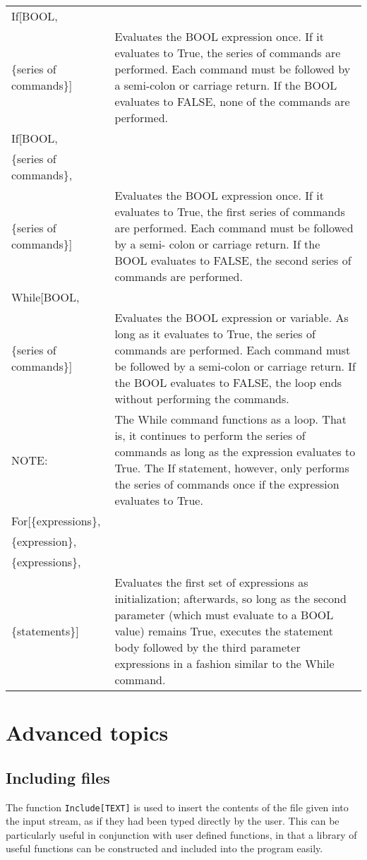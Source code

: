 \begin{tabular}{lp{4in}}
If[BOOL, & \\
\{series of commands\}] & Evaluates the BOOL expression
once. If it evaluates to True, the series of commands are performed.
Each command must be followed by a semi-colon or carriage return.  If
the BOOL evaluates to FALSE, none of the commands are performed.\\
If[BOOL, & \\
\{series of commands\}, & \\
\{series of commands\}] & Evaluates the BOOL expression
once. If it evaluates to True, the first series of commands are
performed.  Each command must be followed by a semi- colon or carriage
return.  If the BOOL evaluates to FALSE, the second series of
commands are performed. \\
While[BOOL, &\\
\{series of commands\}] & Evaluates the BOOL
expression or variable.  As long as it evaluates to True, the series
of commands are performed.  Each command must be followed by a
semi-colon or carriage return.  If the BOOL evaluates to FALSE, the
loop ends without performing the commands.\\
NOTE: & The While command functions as a
loop.  That is, it continues to perform the series of commands as long
as the expression evaluates to True.  The If statement, however, only
performs the series of commands once if the expression evaluates to
True.\\
For[\{expressions\}, & \\
\{expression\}, & \\
\{expressions\}, & \\
\{statements\}] & Evaluates the first set of expressions as initialization;
afterwards, so long as the second parameter (which must evaluate to a 
BOOL value) remains True, executes the statement body followed by the
third parameter expressions in a fashion similar to the While command.
\end{tabular}

\section{Advanced topics}

\subsection{Including files}

The function {\tt Include[TEXT]} is used to insert the contents of the file
given into the input stream, as if they had been typed directly by the user.
This can be particularly useful in conjunction with user defined functions, in that
a library of useful functions can be constructed and included into the program
easily.

